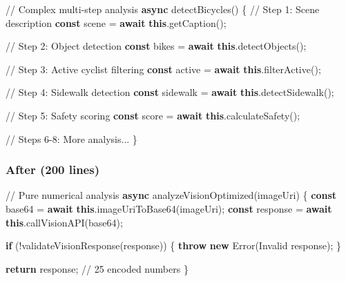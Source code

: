 \documentclass[
  letterpaper,
  DIV=11,
  numbers=noendperiod]{scrartcl}
\newenvironment{Shaded}{\begin{snugshade}}{\end{snugshade}}
\newcommand{\BuiltInTok}[1]{\textcolor[rgb]{0.00,0.23,0.31}{#1}}
\newcommand{\CommentTok}[1]{\textcolor[rgb]{0.37,0.37,0.37}{#1}}
\newcommand{\ControlFlowTok}[1]{\textcolor[rgb]{0.00,0.23,0.31}{\textbf{#1}}}
\newcommand{\FunctionTok}[1]{\textcolor[rgb]{0.28,0.35,0.67}{#1}}
\newcommand{\KeywordTok}[1]{\textcolor[rgb]{0.00,0.23,0.31}{\textbf{#1}}}
\newcommand{\NormalTok}[1]{\textcolor[rgb]{0.00,0.23,0.31}{#1}}
\newcommand{\OperatorTok}[1]{\textcolor[rgb]{0.37,0.37,0.37}{#1}}
\newcommand{\StringTok}[1]{\textcolor[rgb]{0.13,0.47,0.30}{#1}}
\begin{document}
\begin{Shaded}
\begin{Highlighting}[]
\CommentTok{// Complex multi{-}step analysis}
\KeywordTok{async} \FunctionTok{detectBicycles}\NormalTok{() \{}
  \CommentTok{// Step 1: Scene description}
  \KeywordTok{const}\NormalTok{ scene }\OperatorTok{=} \ControlFlowTok{await} \KeywordTok{this}\OperatorTok{.}\FunctionTok{getCaption}\NormalTok{()}\OperatorTok{;}
  
  \CommentTok{// Step 2: Object detection}
  \KeywordTok{const}\NormalTok{ bikes }\OperatorTok{=} \ControlFlowTok{await} \KeywordTok{this}\OperatorTok{.}\FunctionTok{detectObjects}\NormalTok{()}\OperatorTok{;}
  
  \CommentTok{// Step 3: Active cyclist filtering}
  \KeywordTok{const}\NormalTok{ active }\OperatorTok{=} \ControlFlowTok{await} \KeywordTok{this}\OperatorTok{.}\FunctionTok{filterActive}\NormalTok{()}\OperatorTok{;}
  
  \CommentTok{// Step 4: Sidewalk detection}
  \KeywordTok{const}\NormalTok{ sidewalk }\OperatorTok{=} \ControlFlowTok{await} \KeywordTok{this}\OperatorTok{.}\FunctionTok{detectSidewalk}\NormalTok{()}\OperatorTok{;}
  
  \CommentTok{// Step 5: Safety scoring}
  \KeywordTok{const}\NormalTok{ score }\OperatorTok{=} \ControlFlowTok{await} \KeywordTok{this}\OperatorTok{.}\FunctionTok{calculateSafety}\NormalTok{()}\OperatorTok{;}
  
  \CommentTok{// Steps 6{-}8: More analysis...}
\NormalTok{\}}
\end{Highlighting}
\end{Shaded}

\subsubsection{After (200 lines)}\label{after-200-lines}

\begin{Shaded}
\begin{Highlighting}[]
\CommentTok{// Pure numerical analysis}
\KeywordTok{async} \FunctionTok{analyzeVisionOptimized}\NormalTok{(imageUri) \{}
  \KeywordTok{const}\NormalTok{ base64 }\OperatorTok{=} \ControlFlowTok{await} \KeywordTok{this}\OperatorTok{.}\FunctionTok{imageUriToBase64}\NormalTok{(imageUri)}\OperatorTok{;}
  \KeywordTok{const}\NormalTok{ response }\OperatorTok{=} \ControlFlowTok{await} \KeywordTok{this}\OperatorTok{.}\FunctionTok{callVisionAPI}\NormalTok{(base64)}\OperatorTok{;}
  
  \ControlFlowTok{if}\NormalTok{ (}\OperatorTok{!}\FunctionTok{validateVisionResponse}\NormalTok{(response)) \{}
    \ControlFlowTok{throw} \KeywordTok{new} \BuiltInTok{Error}\NormalTok{(}\StringTok{\textquotesingle{}Invalid response\textquotesingle{}}\NormalTok{)}\OperatorTok{;}
\NormalTok{  \}}
  
  \ControlFlowTok{return}\NormalTok{ response}\OperatorTok{;} \CommentTok{// 25 encoded numbers}
\NormalTok{\}}
\end{Highlighting}
\end{Shaded}
\end{document}
